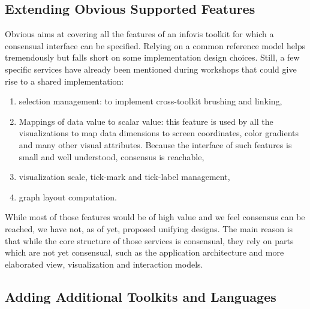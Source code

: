 
\subsection{Extending Obvious Supported Features}

Obvious aims at covering all the features of an infovis toolkit for
which a consensual interface can be specified.  Relying on a common
reference model helps tremendously but falls short on some
implementation design choices.  Still, a few specific services have
already been mentioned during workshops that could give rise to a
shared implementation:

\begin{enumerate}[noitemsep]
\item selection management: to implement cross-toolkit brushing and
  linking,
\item Mappings of data value to scalar value: this feature is used by
  all the visualizations to map data dimensions to screen coordinates,
  color gradients and many other visual attributes. Because the
  interface of such features is small and well understood, consensus
  is reachable,
\item visualization scale, tick-mark and tick-label management,
\item graph layout computation.
\end{enumerate}

While most of those features would be of high value and we feel
consensus can be reached, we have not, as of yet, proposed unifying
designs.  The main reason is that while the core structure of those
services is consensual, they rely on parts which are not yet
consensual, such as the application architecture and more elaborated
view, visualization and interaction models.

\subsection{Adding Additional Toolkits and Languages}

\begin{comment}

A true test of how generalizable and unifying Obvious would be
post-hoc integration of a new toolkit. IBM ILOG JViews~\cite{JViews}
is one such example being considered. Because it is a commercial
product, this would have the advantage of bringing considerable
exposure to the unification platform.
\end{comment}

